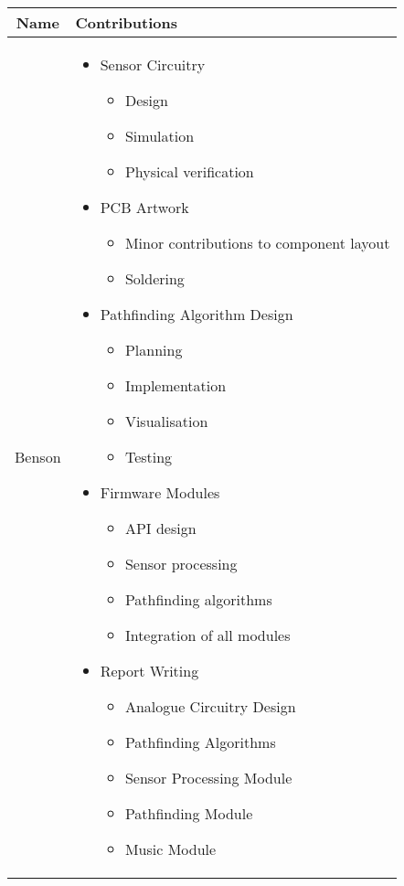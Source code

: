 \documentclass[conference]{IEEEtran}
\begin{document}
\bgroup
\def\arraystretch{1.5}
\begin{tabularx}{\linewidth}{ | c | X | }
	\hline
	Name   & Contributions                     \\
	\hline
	Benson & \begin{itemize}
		         \item Sensor Circuitry
		               \begin{itemize}
			      \item Design
			      \item Simulation
			      \item Physical verification
		      \end{itemize}
		         \item PCB Artwork
		               \begin{itemize}
			      \item Minor contributions to component layout
			      \item Soldering
		      \end{itemize}
		         \item Pathfinding Algorithm Design
		               \begin{itemize}
			      \item Planning
			      \item Implementation
			      \item Visualisation
			      \item Testing
		      \end{itemize}
		         \item Firmware Modules
		               \begin{itemize}
			      \item API design
			      \item Sensor processing
			      \item Pathfinding algorithms
			      \item Integration of all modules
		      \end{itemize}
		         \item Report Writing
		               \begin{itemize}
			      \item Analogue Circuitry Design
			      \item Pathfinding Algorithms
			      \item Sensor Processing Module
			      \item Pathfinding Module
			      \item Music Module
		      \end{itemize}
	         \end{itemize} \\
	\hline


\end{tabularx}
\end{document}
